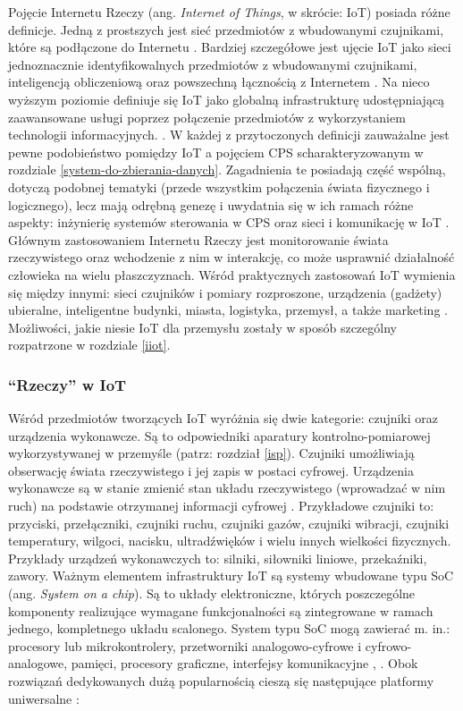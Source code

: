 \documentclass[a4paper, 12pt, twoside]{article}
\begin{document}
Pojęcie Internetu Rzeczy (ang. \emph{Internet of Things}, w skrócie: IoT) posiada różne definicje. 
Jedną z prostszych jest sieć przedmiotów z wbudowanymi czujnikami, które są podłączone
do Internetu \cite{intro-to-iot}. Bardziej szczegółowe jest ujęcie IoT jako sieci jednoznacznie
identyfikowalnych przedmiotów z wbudowanymi czujnikami, inteligencją obliczeniową
oraz powszechną łącznością z Internetem \cite{iot-hype-to-reality}.
Na nieco wyższym poziomie definiuje się IoT jako globalną infrastrukturę udostępniającą
zaawansowane usługi poprzez połączenie przedmiotów z wykorzystaniem technologii informacyjnych.
\cite{intro-to-iot}. W każdej z przytoczonych
definicji zauważalne jest pewne podobieństwo pomiędzy IoT a pojęciem CPS 
scharakteryzowanym w rozdziale \ref{system-do-zbierania-danych}. Zagadnienia te
posiadają część wspólną, dotyczą podobnej tematyki (przede wszystkim połączenia świata fizycznego i logicznego), 
lecz mają odrębną genezę i uwydatnia się w ich ramach różne aspekty: 
inżynierię systemów sterowania w CPS oraz sieci i komunikację w IoT \cite{cps-vs-iot}.
Głównym zastosowaniem Internetu Rzeczy jest monitorowanie świata rzeczywistego 
oraz wchodzenie z nim w interakcję, co może usprawnić działalność człowieka na wielu płaszczyznach.
Wśród praktycznych zastosowań IoT wymienia się między innymi:
sieci czujników i pomiary rozproszone, urządzenia (gadżety) ubieralne, 
inteligentne budynki, miasta, logistyka, przemysł, a także marketing \cite{internet-reczy}. 
Możliwości, jakie niesie IoT dla przemysłu zostały w sposób szczególny rozpatrzone 
w rozdziale \ref{iiot}.

\subsubsection{``Rzeczy'' w IoT}

Wśród przedmiotów tworzących IoT wyróżnia się dwie kategorie: 
czujniki oraz urządzenia wykonawcze. Są to odpowiedniki aparatury kontrolno-pomiarowej 
wykorzystywanej w przemyśle (patrz: rozdział \ref{isp}). Czujniki umożliwiają
obserwację świata rzeczywistego i jej zapis w postaci cyfrowej.  
Urządzenia wykonawcze są w stanie zmienić stan układu rzeczywistego (wprowadzać w nim ruch)
na podstawie otrzymanej informacji cyfrowej \cite{iot-hype-to-reality}.
Przykładowe czujniki to: przyciski, przełączniki, czujniki ruchu, czujniki gazów,
czujniki wibracji, czujniki temperatury, wilgoci,
nacisku, ultradźwięków i wielu innych wielkości fizycznych. Przykłady urządzeń
wykonawczych to: silniki, siłowniki liniowe, przekaźniki, zawory. Ważnym elementem
infrastruktury IoT są systemy wbudowane typu SoC (ang. \emph{System on a chip}).  
Są to układy elektroniczne, których poszczególne komponenty realizujące wymagane 
funkcjonalności są zintegrowane w ramach jednego, kompletnego układu scalonego. 
System typu SoC mogą zawierać m. in.: procesory lub mikrokontrolery, przetworniki
analogowo-cyfrowe i cyfrowo-analogowe, pamięci, procesory graficzne, interfejsy komunikacyjne \cite{intro-to-iot}, \cite{soc}. 
Obok rozwiązań dedykowanych dużą popularnością cieszą się następujące platformy uniwersalne \cite{intro-to-iot}:
\end{document}
